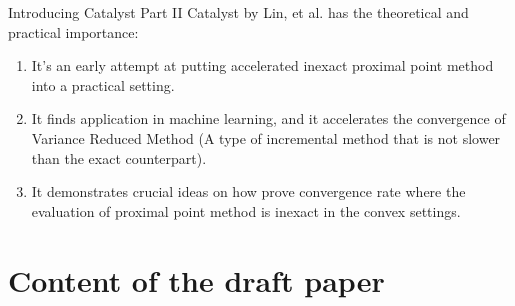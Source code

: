 \documentclass[11pt]{beamer}
\theoremstyle{definition}
\begin{document}
        \begin{frame}{Introducing Catalyst Part II}
            Catalyst by Lin, et al. \cite{lin_catalyst_2018, lin_universal_2015} has the theoretical and practical importance: 
            \begin{enumerate}
                \item It's an early attempt at putting accelerated inexact proximal point method into a practical setting. 
                \item It finds application in machine learning, and it accelerates the convergence of Variance Reduced Method (A type of incremental method that is not slower than the exact counterpart). 
                \item It demonstrates crucial ideas on how prove convergence rate where the evaluation of proximal point method is inexact in the convex settings. 
            \end{enumerate}
        \end{frame}

\section{Content of the draft paper}
\end{document}
